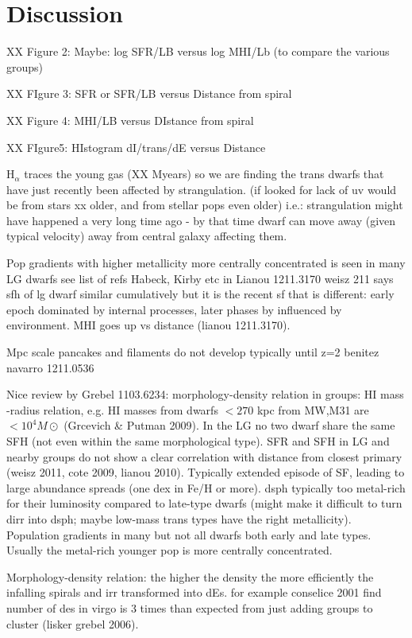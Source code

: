 \documentclass[12pt,preprint]{emulateapj}
\begin{document}
\section{Discussion} 


XX Figure 2: Maybe: log SFR/LB versus log MHI/Lb (to compare the various groups)

XX FIgure 3: SFR or SFR/LB versus Distance from spiral

XX Figure 4: MHI/LB versus DIstance from spiral

XX FIgure5: HIstogram dI/trans/dE versus Distance

H$_\alpha$ traces the young gas (XX Myears) so we are finding the trans dwarfs that have just recently been affected by strangulation. (if looked for lack 
of uv would be from stars xx older, and from stellar pops even older) i.e.: strangulation might have happened a very long time ago - by that time dwarf can 
move away (given typical velocity) away from central galaxy affecting them.

Pop gradients with higher metallicity more centrally concentrated is seen in many LG dwarfs see list of refs Habeck, Kirby etc in Lianou 1211.3170
weisz 211 says sfh of lg dwarf similar cumulatively but it is the recent sf that is different: early epoch dominated by internal processes, later phases by 
influenced by environment. MHI goes up vs distance (lianou 1211.3170).

Mpc scale pancakes and filaments do not develop typically until z=2 benitez navarro 1211.0536

Nice review by Grebel 1103.6234: morphology-density relation in groups: HI mass -radius relation, e.g. HI masses from dwarfs $<270$ kpc from MW,M31 are
 $<10^4 M\odot$ (Grcevich \& Putman 2009). In the LG no two dwarf share the same SFH (not even within the same morphological type). SFR and SFH in 
 LG and nearby groups do not show a clear correlation with distance from closest primary (weisz 2011, cote 2009, lianou 2010). Typically extended episode 
of SF, leading to large abundance spreads (one dex in Fe/H or more). dsph typically too metal-rich for their luminosity compared to late-type dwarfs (might 
make it difficult to turn dirr into dsph; maybe low-mass trans types have the right metallicity). Population gradients in many but not all dwarfs both early and 
late types. Usually the metal-rich younger pop is more centrally concentrated.

Morphology-density relation: the higher the density the more efficiently the infalling spirals and irr transformed into dEs. for example conselice 2001 find 
number of des in virgo is 3 times than expected from just adding groups to cluster (lisker grebel 2006).
\end{document}
